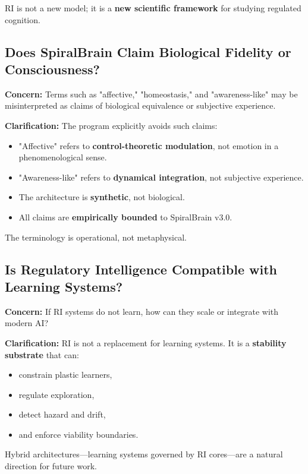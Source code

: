 \documentclass[12pt,a4paper]{report}
\begin{document}
RI is not a new model; it is a \textbf{new scientific framework} for studying regulated cognition.

\subsection{Does SpiralBrain Claim Biological Fidelity or Consciousness?}

\textbf{Concern:}  
Terms such as "affective," "homeostasis," and "awareness-like" may be misinterpreted as claims of biological equivalence or subjective experience.

\textbf{Clarification:}  
The program explicitly avoids such claims:

\begin{itemize}
\item "Affective" refers to \textbf{control-theoretic modulation}, not emotion in a phenomenological sense.  
\item "Awareness-like" refers to \textbf{dynamical integration}, not subjective experience.  
\item The architecture is \textbf{synthetic}, not biological.  
\item All claims are \textbf{empirically bounded} to SpiralBrain v3.0.
\end{itemize}

The terminology is operational, not metaphysical.

\subsection{Is Regulatory Intelligence Compatible with Learning Systems?}

\textbf{Concern:}  
If RI systems do not learn, how can they scale or integrate with modern AI?

\textbf{Clarification:}  
RI is not a replacement for learning systems. It is a \textbf{stability substrate} that can:

\begin{itemize}
\item constrain plastic learners,  
\item regulate exploration,  
\item detect hazard and drift,  
\item and enforce viability boundaries.
\end{itemize}

Hybrid architectures—learning systems governed by RI cores—are a natural direction for future work.
\end{document}
